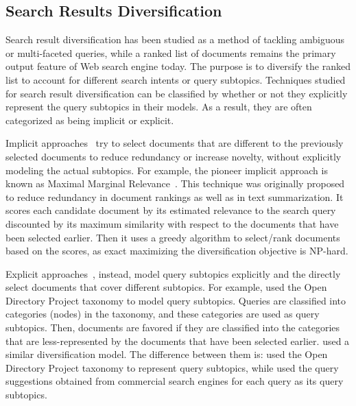 \subsection{Search Results Diversification}
Search result diversification has been studied as a method of tackling ambiguous or multi-faceted queries, while a ranked list of documents remains the primary output feature of Web search engine today. The purpose is to diversify the ranked list to account for different search intents or query subtopics.
Techniques studied for search result diversification can be classified by whether or not they explicitly represent the query subtopics in their models. As a result, they are often
categorized as being implicit or explicit. 

Implicit approaches~\cite{carbonell1998use,zhai2003beyond} try to select documents that are different to the previously selected documents to reduce redundancy or increase novelty, without explicitly modeling the actual subtopics. For example, the pioneer implicit approach is known as Maximal Marginal Relevance~\cite{carbonell1998use}. This technique was originally proposed to reduce redundancy in document rankings as well as in text summarization. It scores each candidate document by its estimated relevance to the search query discounted by its maximum similarity with respect to the documents that have been selected earlier. Then it uses a greedy algorithm to select/rank documents based on the scores, as exact maximizing the diversification objective is NP-hard.

Explicit  approaches~\cite{agrawal2009diversifying,carterette2009probabilistic,santos2010exploiting,dang2012diversity,dang2013term}, instead, model query subtopics explicitly and the directly select documents that cover different subtopics. For example, \citet{agrawal2009diversifying} used the Open Directory Project taxonomy to model
query subtopics. Queries are classified into categories (nodes) in the taxonomy, and these categories are used as query subtopics. Then, documents are favored if they are classified into the categories that are less-represented by the documents that have been selected earlier. \citet{santos2010exploiting} used a similar diversification model. The difference between them is: \citet{agrawal2009diversifying} used the Open Directory Project taxonomy to represent query subtopics, while \citet{santos2010exploiting} used the query suggestions obtained from commercial search engines for each query as its query subtopics. 
 
